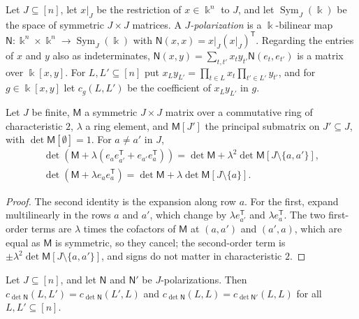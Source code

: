 \begin{definition}\label{ocl:def:polarization}
Let $J\subseteq[n]$, let $x|_J$ be the restriction of $x\in\Bbbk^n$ to $J$, and let $\operatorname{Sym}_J(\Bbbk)$ be the
space of symmetric $J\times J$ matrices. A \emph{$J$-polarization} is a $\Bbbk$-bilinear map $\mathsf
N\colon\Bbbk^n\times\Bbbk^n\to\operatorname{Sym}_J(\Bbbk)$ with $\mathsf N(x,x)=x|_J(x|_J)^{\mathsf T}$. Regarding the
entries of $x$ and $y$ also as indeterminates, $\mathsf N(x,y)=\sum_{t,t'}x_ty_{t'}\mathsf N(e_t,e_{t'})$ is a matrix
over $\Bbbk[x,y]$. For $L,L'\subseteq[n]$ put $x_Ly_{L'}=\prod_{t\in L}x_t\prod_{t'\in L'}y_{t'}$, and for
$g\in\Bbbk[x,y]$ let $c_g(L,L')$ be the coefficient of $x_Ly_{L'}$ in $g$.
\end{definition}

\begin{lemma}\label{ocl:lem:update}
Let $J$ be finite, $\mathsf M$ a symmetric $J\times J$ matrix over a commutative ring of characteristic $2$, $\lambda$ a
ring element, and $\mathsf M[J']$ the principal submatrix on $J'\subseteq J$, with $\det\mathsf M[\emptyset]=1$. For
$a\ne a'$ in $J$,
\begin{gather*}
 \det(\mathsf M+\lambda(e_ae_{a'}^{\mathsf T}+e_{a'}e_a^{\mathsf T}))=\det\mathsf M+\lambda^2\det\mathsf
M[J\setminus\{a,a'\}],\\
 \det(\mathsf M+\lambda e_ae_a^{\mathsf T})=\det\mathsf M+\lambda\det\mathsf M[J\setminus\{a\}].
\end{gather*}
\end{lemma}

\begin{proof}
The second identity is the expansion along row $a$. For the first, expand multilinearly in the rows $a$ and $a'$, which
change by $\lambda e_{a'}^{\mathsf T}$ and $\lambda e_a^{\mathsf T}$. The two first-order terms are $\lambda$ times the
cofactors of $\mathsf M$ at $(a,a')$ and $(a',a)$, which are equal as $\mathsf M$ is symmetric, so they cancel; the
second-order term is $\pm\lambda^2\det\mathsf M[J\setminus\{a,a'\}]$, and signs do not matter in characteristic $2$.
\end{proof}

\begin{lemma}\label{ocl:lem:polarizations}
Let $J\subseteq[n]$, and let $\mathsf N$ and $\mathsf N'$ be $J$-polarizations. Then $c_{\det\mathsf
N}(L,L')=c_{\det\mathsf N}(L',L)$ and $c_{\det\mathsf N}(L,L)=c_{\det\mathsf N'}(L,L)$ for all $L,L'\subseteq[n]$.
\end{lemma}


